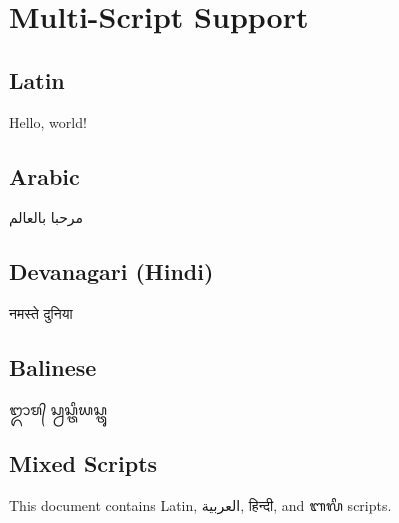 \documentclass{article}
\begin{document}
\section{Multi-Script Support}

\subsection{Latin}
Hello, world!

\subsection{Arabic}
{\arabicfont مرحبا بالعالم}

\subsection{Devanagari (Hindi)}
{\devanagarifont नमस्ते दुनिया}

\subsection{Balinese}
{\balinesefont ᬒᬫ᭄ ᬲ᭄ᬯᬲ᭄ᬢᬶᬬᬲ᭄ᬢᬸ}

\subsection{Mixed Scripts}
This document contains Latin, {\arabicfont العربية}, {\devanagarifont हिन्दी}, and {\balinesefont ᬩᬮᬶ} scripts.
\end{document}
